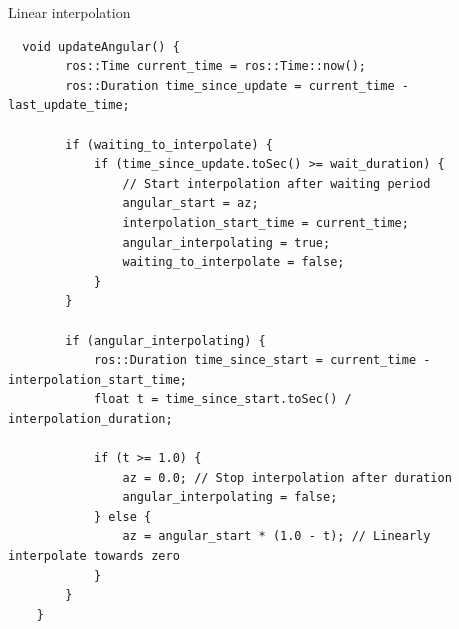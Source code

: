 \documentclass[../../main]{subfiles}
\begin{document}
\begin{codebox}{Linear interpolation}
  \begin{verbatim}
  void updateAngular() {
        ros::Time current_time = ros::Time::now();
        ros::Duration time_since_update = current_time - last_update_time;

        if (waiting_to_interpolate) {
            if (time_since_update.toSec() >= wait_duration) {
                // Start interpolation after waiting period
                angular_start = az;
                interpolation_start_time = current_time;
                angular_interpolating = true;
                waiting_to_interpolate = false;
            }
        }

        if (angular_interpolating) {
            ros::Duration time_since_start = current_time - interpolation_start_time;
            float t = time_since_start.toSec() / interpolation_duration;

            if (t >= 1.0) {
                az = 0.0; // Stop interpolation after duration
                angular_interpolating = false;
            } else {
                az = angular_start * (1.0 - t); // Linearly interpolate towards zero
            }
        }
    }

\end{verbatim}
\end{codebox}
\end{document}
